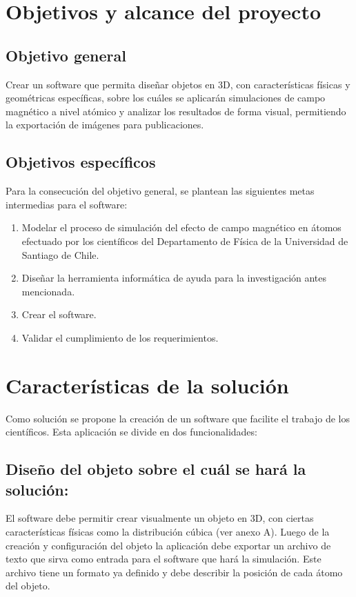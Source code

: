 \section{Objetivos y alcance del proyecto}
\label{intro:objetivos}

\subsection{Objetivo general}
Crear un software que permita diseñar objetos en 3D, con características físicas y geométricas específicas, sobre los cuáles se aplicarán simulaciones de campo magnético a nivel atómico y analizar los resultados de forma visual, permitiendo la exportación de imágenes para publicaciones.

\subsection{Objetivos espec\'ificos}

Para la consecución del objetivo general, se plantean las siguientes metas intermedias para el software:

\begin{enumerate}
  \item Modelar el proceso de simulación del efecto de campo magnético en átomos efectuado por los científicos del Departamento de Física de la Universidad de Santiago de Chile.
  \item Diseñar la herramienta informática de ayuda para la investigación antes mencionada.
  \item Crear el software.
  \item Validar el cumplimiento de los requerimientos.
\end{enumerate}


\section{Características de la solución}

Como solución se propone la creación de un software que facilite el trabajo de los científicos. Esta aplicación se divide en dos funcionalidades:

\subsection{Diseño del objeto sobre el cuál se hará la solución:}

El software debe permitir crear visualmente un objeto en 3D, con ciertas características físicas como la distribución cúbica (ver anexo A). Luego de la creación y configuración del objeto la aplicación debe exportar un archivo de texto que sirva como entrada para el software que hará la simulación. Este archivo tiene un formato ya definido y debe describir la posición de cada átomo del objeto.

